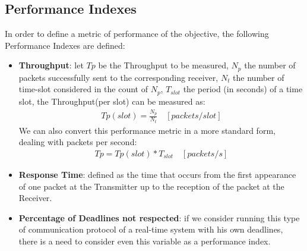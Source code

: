 \subsection{Performance Indexes}
In order to define a metric of performance of the objective, the following Performance Indexes are defined:
\begin{itemize}
	\item \textbf{Throughput}: let $Tp$ be the Throughput to be measured, $N_{p}$ the number of packets successfully sent to the corresponding receiver, $N_{t}$ the number of time-slot considered in the count of $N_{p}$, $T_{slot}$ the period (in seconds) of a time slot, the Throughput(per slot) can be measured as:
	\begin{align*}
	Tp(slot) = \frac{N_{p}}{N_{t}} \quad [packets/slot]
	\end{align*}
	We can also convert this performance metric in a more standard form, dealing with packets per second:
	\begin{align*}
	Tp = Tp(slot) * T_{slot} \quad [packets/s]
	\end{align*}
	
	
	\item \textbf{Response Time}: defined as the time that occurs from the first appearance of one packet at the Transmitter up to the reception of the packet at the Receiver.
	
	\item \textbf{Percentage of Deadlines not respected}: if we consider running this type of communication protocol of a real-time system with his own deadlines, there is a need to consider even this variable as a performance index.
\end{itemize}